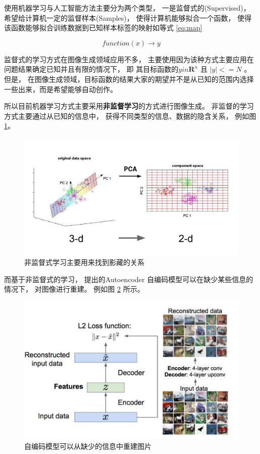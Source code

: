 
使用机器学习与人工智能方法主要分为两个类型， 一是监督式的(Supervised)， 希望给计算机一定的监督样本(Samples)， 使得计算机能够拟合一个函数， 使得该函数能够拟合训练数据到已知样本标签的映射如等式 \eqref{eq:map}

\begin{equation}\label{eq:map}
function(x) \rightarrow y
\end{equation}

监督式的学习方式在图像生成领域应用不多， 主要使用因为该种方式主要应用在问题结果确定已知并且有限的情况下， 即 其目标函数的$y in \mathbf{R}^n$ 且 $|y| <= N$ 。 但是， 在图像生成领域，目标函数的结果大家的期望并不是从已知的范围内选择一些出来，而是希望能够自动创作。 

所以目前机器学习方式主要采用\textbf{非监督学习}的方式进行图像生成。 非监督的学习方式主要通过从已知的信息中， 获得不同类型的信息、数据的隐含关系， 例如图 \ref{img:unsupervised}。 

\begin{figure}[htbp]
    \centering 
    \includegraphics[width = .55\linewidth]{data/chapter-2/unsupervised.png} 
    \caption{非监督式学习主要用来找到影藏的关系} 
    \label{img:unsupervised} 
\end{figure}

而基于非监督式的学习， 提出的Autoencoder 自编码模型可以在缺少某些信息的情况下， 对图像进行重建。 例如图 \ref{img:autoencoder} 所示。

\begin{figure}[htbp]
    \centering  
    \includegraphics[width = .55\linewidth]{data/chapter-2/autoencoder.png} 
    \caption{自编码模型可以从缺少的信息中重建图片} 
    \label{img:autoencoder} 
\end{figure}

